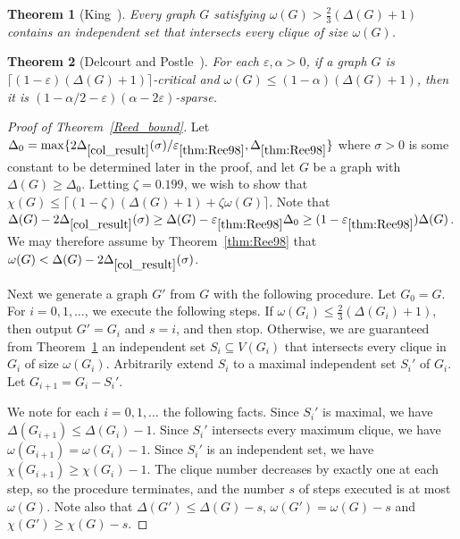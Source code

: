 \documentclass[11pt]{article}
\theoremstyle{plain}
\newtheorem{theorem}{Theorem}[section]
\newcommand{\eps}{\varepsilon}
\begin{document}
\begin{theorem}[King~\cite{Kin11}]\label{thm:Kin11}
Every graph $G$ satisfying $\omega(G)>\frac23(\Delta(G)+1)$ contains an independent set that intersects every clique of size $\omega(G)$.
\end{theorem}

\begin{theorem}[Delcourt and Postle~\cite{DePo17}]\label{thm:DePo17}
For each $\eps,\alpha>0$, if a graph $G$ is 
$\lceil(1-\eps)(\Delta(G)+1)\rceil$-critical
and $\omega(G) \le(1-\alpha)(\Delta(G)+1)$, then it is $(1-\alpha/2-\eps)(\alpha-2\eps)$-sparse.
\end{theorem}

\begin{proof}[Proof of Theorem~\ref{Reed_bound}]
Let $\Delta_0 = \max\{2\Delta_{\ref{col_result}}(\sigma)/\eps_{\ref{thm:Ree98}},\Delta_{\ref{thm:Ree98}}\}$ where $\sigma>0$ is some constant to be determined later in the proof, and let $G$ be a graph with $\Delta(G)\ge \Delta_0$.
Letting $\zeta=0.199$, we wish to show that $\chi(G) \le \lceil(1-\zeta)(\Delta(G)+1)+\zeta\omega(G)\rceil$.
Note that $\Delta(G)-2 \Delta_{\ref{col_result}}(\sigma)\ge \Delta(G)-\eps_{\ref{thm:Ree98}}\Delta_0 \ge (1-\eps_{\ref{thm:Ree98}})\Delta(G)$.
We may therefore assume by Theorem~\ref{thm:Ree98} that $\omega(G) < \Delta(G)-2 \Delta_{\ref{col_result}}(\sigma)$. %

Next we generate a graph $G'$ from $G$ with the following procedure.
Let $G_0=G$. For $i=0,1,\dots$, we execute the following steps.
If $\omega(G_i)\le \frac23(\Delta(G_i)+1)$, then output $G'=G_i$ and $s=i$, and then stop.
Otherwise, we are guaranteed from Theorem~\ref{thm:Kin11} an independent set $S_i\subseteq V(G_i)$ that intersects every clique in $G_i$ of size $\omega(G_i)$.
Arbitrarily extend $S_i$ to a maximal independent set $S_i'$ of $G_i$. Let $G_{i+1}=G_i-S_i'$.

We note for each $i=0,1,\dots$ the following facts. Since $S_i'$ is maximal, we have $\Delta(G_{i+1})\le \Delta(G_i)-1$. Since $S_i'$ intersects every maximum clique, we have $\omega(G_{i+1})=\omega(G_i)-1$.
Since $S_i'$ is an independent set, we have $\chi(G_{i+1})\ge \chi(G_i)-1$.
The clique number decreases by exactly one at each step, so the procedure terminates, and the number $s$ of steps executed is at most $\omega(G)$.
Note also that $\Delta(G')\le \Delta(G)-s$, $\omega(G')=\omega(G)-s$ and $\chi(G')\ge \chi(G)-s$.


\end{proof}
\end{document}
